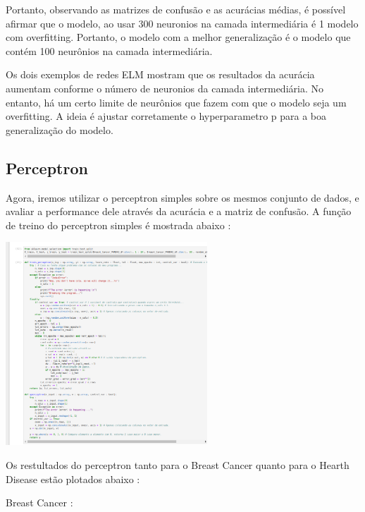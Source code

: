\documentclass{article}
\begin{document}
\begin{center}
\begin{center}
\end{center}

Portanto, observando as matrizes de confusão e as acurácias médias, é possível afirmar que o modelo, ao usar 300 neuronios na camada intermediária é 1 modelo com overfitting. Portanto, o modelo com a melhor generalização é o modelo que contém 100 neurônios na camada intermediária.
\vspace{10pt}

Os dois exemplos de redes ELM mostram que os resultados da acurácia aumentam conforme o número de neuronios da camada intermediária. No entanto, há um certo limite de neurônios que fazem com que o modelo seja um overfitting. A ideia é ajustar corretamente o hyperparametro p para a boa generalização do modelo.



\subsection{Perceptron}
Agora, iremos utilizar o perceptron simples sobre os mesmos conjunto de dados, e avaliar a performance dele através da acurácia e a matriz de confusão. A função de treino do perceptron simples é mostrada abaixo : 
\begin{center}

\includegraphics[height=3in]{Ex6/perceptron/train_perceptron.png}
\vspace{10pt}

\end{center}


Os restultados do perceptron tanto para o Breast Cancer quanto para o Hearth Disease estão plotados abaixo : 

\vspace{10pt}

Breast Cancer : 


\end{center}
\end{document}
